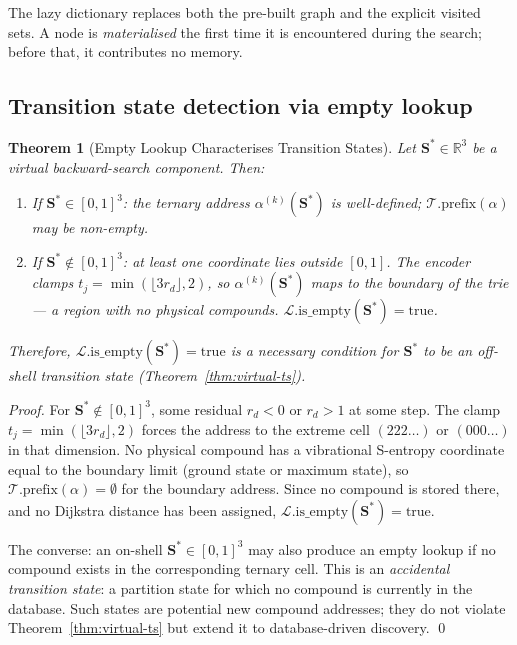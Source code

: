 \documentclass[twocolumn,10pt,a4paper]{article}
\theoremstyle{thmstyle}
\newtheorem{theorem}{Theorem}[section]
\theoremstyle{definition}
\theoremstyle{remark}
\newcommand{\R}{\mathbb{R}}
\newcommand{\Sv}{\mathbf{S}}
\begin{document}
The lazy dictionary replaces both the pre-built graph and the explicit
visited sets. A node is \emph{materialised} the first time it is
encountered during the search; before that, it contributes no memory.

\subsection{Transition state detection via empty lookup}

\begin{theorem}[Empty Lookup Characterises Transition States]
\label{thm:empty-ts}
Let $\Sv^* \in \R^3$ be a virtual backward-search component. Then:
\begin{enumerate}[nosep,label=(\roman*)]
\item If $\Sv^* \in [0,1]^3$: the ternary address $\alpha^{(k)}(\Sv^*)$
  is well-defined; $\mathcal{T}.\text{prefix}(\alpha)$ may be non-empty.
\item If $\Sv^* \notin [0,1]^3$: at least one coordinate lies outside
  $[0,1]$. The encoder clamps $t_j = \min(\lfloor 3 r_d\rfloor, 2)$,
  so $\alpha^{(k)}(\Sv^*)$ maps to the boundary of the trie — a region
  with no physical compounds. $\mathcal{L}.\text{is\_empty}(\Sv^*) = \text{true}$.
\end{enumerate}
Therefore, $\mathcal{L}.\text{is\_empty}(\Sv^*) = \text{true}$ is a
necessary condition for $\Sv^*$ to be an off-shell transition state
(Theorem~\ref{thm:virtual-ts}).
\end{theorem}

\begin{proof}
For $\Sv^* \notin [0,1]^3$, some residual $r_d < 0$ or $r_d > 1$ at
some step. The clamp $t_j = \min(\lfloor 3r_d\rfloor, 2)$ forces the
address to the extreme cell $(222\ldots)$ or $(000\ldots)$ in that
dimension. No physical compound has a vibrational S-entropy coordinate
equal to the boundary limit (ground state or maximum state), so
$\mathcal{T}.\text{prefix}(\alpha) = \emptyset$ for the boundary
address. Since no compound is stored there, and no Dijkstra distance
has been assigned, $\mathcal{L}.\text{is\_empty}(\Sv^*) = \text{true}$.

The converse: an on-shell $\Sv^* \in [0,1]^3$ may also produce an empty
lookup if no compound exists in the corresponding ternary cell. This is
an \emph{accidental transition state}: a partition state for which no
compound is currently in the database. Such states are potential new
compound addresses; they do not violate Theorem~\ref{thm:virtual-ts}
but extend it to database-driven discovery. \qed
\end{proof}
\end{document}
